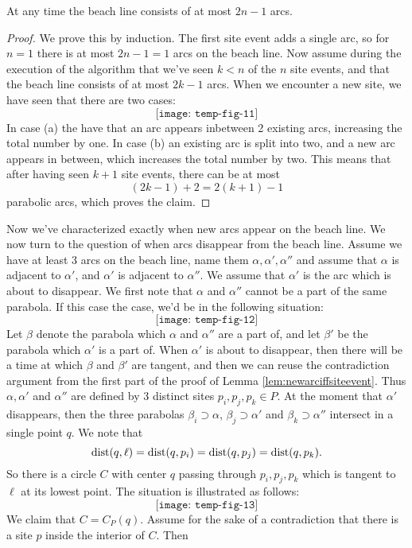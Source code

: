 \begin{cor}
At any time the beach line consists of at most $2n-1$ arcs.
\end{cor}
\begin{proof}
We prove this by induction. The first site event adds a single arc, so for $n = 1$ there is at most $2n - 1 = 1$ arcs on the beach line. Now assume during the execution of the algorithm that we've seen $k < n$ of the $n$ site events, and that the beach line consists of at most $2k - 1$ arcs. When we encounter a new site, we have seen that there are two cases:
\[
    \texttt{[image: temp-fig-11]}
\]
In case (a) the have that an arc appears inbetween 2 existing arcs, increasing the total number by one. In case (b) an existing arc is split into two, and a new arc appears in between, which increases the total number by two. This means that after having seen $k + 1$ site events, there can be at most
\[
    (2k - 1) + 2 = 2(k + 1) - 1
\]
parabolic arcs, which proves the claim.
\end{proof}
Now we've characterized exactly when new arcs appear on the beach line. We now turn to the question of when arcs disappear from the beach line. Assume we have at least 3 arcs on the beach line, name them $\alpha, \alpha', \alpha''$ and assume that $\alpha$ is adjacent to $\alpha'$, and $\alpha'$ is adjacent to $\alpha''$. We assume that $\alpha'$ is the arc which is about to disappear. We first note that $\alpha$ and $\alpha''$ cannot be a part of the same parabola. If this case the case, we'd be in the following situation:
\[
    \texttt{[image: temp-fig-12]}
\]
Let $\beta$ denote the parabola which $\alpha$ and $\alpha''$ are a part of, and let $\beta'$ be the parabola which $\alpha'$ is a part of. When $\alpha'$ is about to disappear, then there will be a time at which $\beta$ and $\beta'$ are tangent, and then we can reuse the contradiction argument from the first part of the proof of Lemma \ref{lem:newarciffsiteevent}. Thus $\alpha, \alpha'$ and $\alpha''$ are defined by 3 distinct sites $p_i, p_j, p_k \in P$. At the moment that $\alpha'$ disappears, then the three parabolas $\beta_i \supset \alpha$, $\beta_j \supset \alpha'$ and $\beta_k \supset \alpha''$ intersect in a single point $q$. We note that
\[
    \operatorname{dist}(q, \ell) = \operatorname{dist}(q, p_i) = \operatorname{dist}(q, p_j) = \operatorname{dist}(q, p_k).
\]
So there is a circle $C$ with center $q$ passing through $p_i, p_j, p_k$ which is tangent to $\ell$ at its lowest point. The situation is illustrated as follows:
\[
    \texttt{[image: temp-fig-13]}
\]
We claim that $C = C_P(q)$. Assume for the sake of a contradiction that there is a site $p$ inside the interior of $C$. Then
